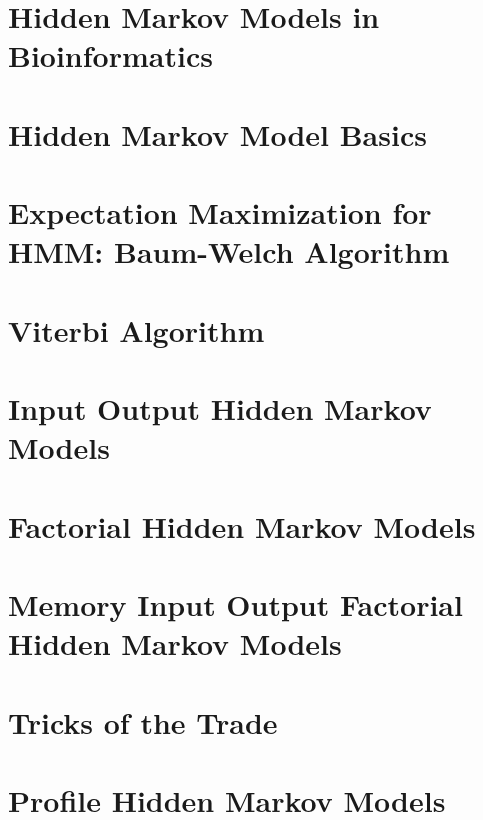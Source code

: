 \documentclass[11pt, oneside]{book}
\begin{document}
\section{Hidden Markov Models in Bioinformatics}


\section{Hidden Markov Model Basics}


\section{Expectation Maximization for HMM: Baum-Welch Algorithm}


\section{Viterbi Algorithm}


\section{Input Output Hidden Markov Models}


\section{Factorial Hidden Markov Models}


\section{Memory Input Output Factorial Hidden Markov Models}


\section{Tricks of the Trade}


\section{Profile Hidden Markov Models}

\end{document}
